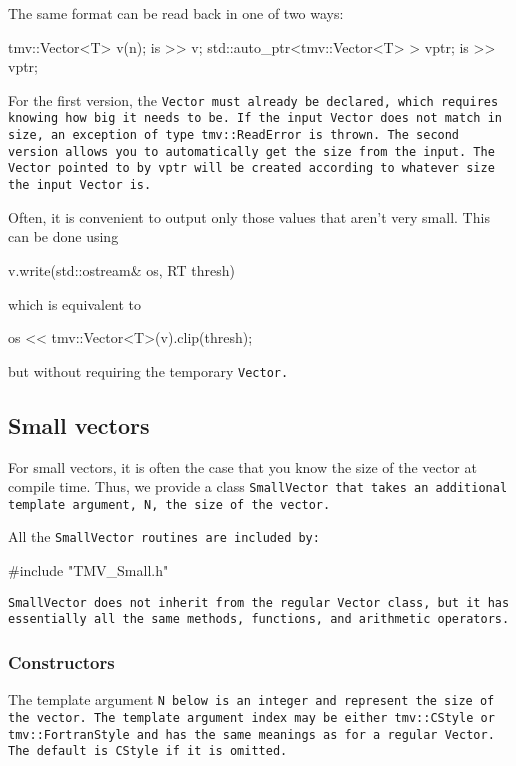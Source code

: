 The same format can be read back in one of two ways:
\begin{tmvcode}
tmv::Vector<T> v(n);
is >> v;
std::auto_ptr<tmv::Vector<T> > vptr;
is >> vptr;
\end{tmvcode}
For the first version, the \tt{Vector} must already be declared, which 
requires knowing how big it needs to be.  If the input \tt{Vector} does not
match in size, an exception of type \tt{tmv::ReadError} is thrown.
The second version allows you to automatically get the size from the input.  
The \tt{Vector} pointed to by \tt{vptr}
will be created according to whatever size the input \tt{Vector} is.

Often, it is convenient to output only those values that aren't very small. 
This can be done using
\begin{tmvcode}
v.write(std::ostream& os, RT thresh)
\end{tmvcode}
which is equivalent to
\begin{tmvcode}
os << tmv::Vector<T>(v).clip(thresh);
\end{tmvcode}
but without requiring the temporary \tt{Vector}.

\subsection{Small vectors}
\label{SmallVector}

For small vectors, it is often the case that you know the size of the vector
at compile time.  Thus, we provide a class \tt{SmallVector} that takes an
additional template argument, \tt{N}, the size of the vector.

All the \tt{SmallVector} routines are included by:
\begin{tmvcode}
#include "TMV_Small.h"
\end{tmvcode}
\tt{SmallVector} does not inherit from the regular \tt{Vector} class, but it has 
essentially all the same methods, functions, and arithmetic operators. 

\subsubsection{Constructors}
\label{SmallVector_Constructors}

The template argument \tt{N} below is an integer and
represent the size of the vector.
The template argument 
 \tt{index} may be either \tt{tmv::CStyle} or
\tt{tmv::FortranStyle} and has the same meanings as 
for a regular \tt{Vector}. The default is \tt{CStyle} if it is omitted.

